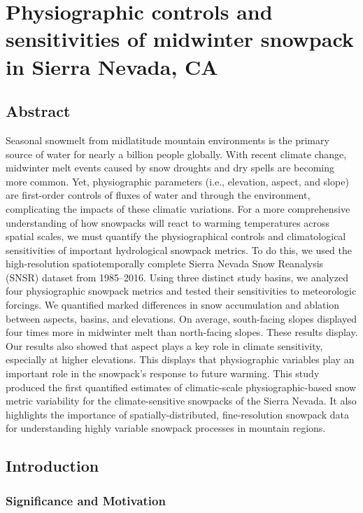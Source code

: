 \hypertarget{ch2}{%
\chapter{Physiographic controls and sensitivities of midwinter snowpack in Sierra Nevada, CA}\label{ch2}}

\hypertarget{ch2-abstract}{\section{Abstract}\label{ch2-abstract}}


Seasonal snowmelt from midlatitude mountain environments is the primary source of water for nearly a billion people globally. With recent climate change, midwinter melt events caused by snow droughts and dry spells are becoming more common. Yet, physiographic parameters (i.e., elevation, aspect, and slope) are first-order controls of fluxes of water and through the environment, complicating the impacts of these climatic variations. For a more comprehensive understanding of how snowpacks will react to warming temperatures across spatial scales, we must quantify the physiographical controls and climatological sensitivities of important hydrological snowpack metrics. To do this, we used the high-resolution spatiotemporally complete Sierra Nevada Snow Reanalysis (SNSR) dataset from 1985--2016. Using three distinct study basins, we analyzed four physiographic snowpack metrics and tested their sensitivities to meteorologic forcings. We quantified marked differences in snow accumulation and ablation between aspects, basins, and elevations. On average, south-facing slopes displayed four times more in midwinter melt than north-facing slopes. These results display. Our results also showed that aspect plays a key role in climate sensitivity, especially at higher elevations. This displays that physiographic variables play an important role in the snowpack's response to future warming. This study produced the first quantified estimates of climatic-scale physiographic-based snow metric variability for the climate-sensitive snowpacks of the Sierra Nevada. It also highlights the importance of spatially-distributed, fine-resolution snowpack data for understanding highly variable snowpack processes in mountain regions.

\hypertarget{ch2-intro}{\section{Introduction}\label{ch2-intro}}
\hypertarget{ch2-intro-1}{\subsection{Significance and Motivation}\label{ch2-intro-1}}


